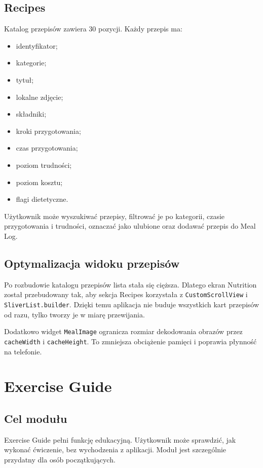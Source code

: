 \documentclass[12pt,a4paper]{article}
\begin{document}
\subsection{Recipes}

Katalog przepisów zawiera 30 pozycji. Każdy przepis ma:

\begin{itemize}
    \item identyfikator;
    \item kategorie;
    \item tytuł;
    \item lokalne zdjęcie;
    \item składniki;
    \item kroki przygotowania;
    \item czas przygotowania;
    \item poziom trudności;
    \item poziom kosztu;
    \item flagi dietetyczne.
\end{itemize}

Użytkownik może wyszukiwać przepisy, filtrować je po kategorii, czasie przygotowania i trudności, oznaczać jako ulubione oraz dodawać przepis do Meal Log.

\subsection{Optymalizacja widoku przepisów}

Po rozbudowie katalogu przepisów lista stała się cięższa. Dlatego ekran Nutrition został przebudowany tak, aby sekcja Recipes korzystała z \texttt{CustomScrollView} i \texttt{SliverList.builder}. Dzięki temu aplikacja nie buduje wszystkich kart przepisów od razu, tylko tworzy je w miarę przewijania.

Dodatkowo widget \texttt{MealImage} ogranicza rozmiar dekodowania obrazów przez \texttt{cacheWidth} i \texttt{cacheHeight}. To zmniejsza obciążenie pamięci i poprawia płynność na telefonie.

\section{Exercise Guide}

\subsection{Cel modułu}

Exercise Guide pełni funkcję edukacyjną. Użytkownik może sprawdzić, jak wykonać ćwiczenie, bez wychodzenia z aplikacji. Moduł jest szczególnie przydatny dla osób początkujących.
\end{document}
